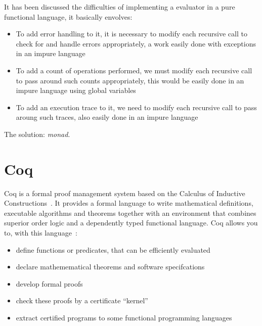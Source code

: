 It has been discussed the difficulties of implementing a evaluator in a pure
functional language, it basically envolves:
\begin{itemize}
\item To add error handling to it, it is necessary to modify each recursive call to
check for and handle errors appropriately, a work easily done with exceptions in
an impure language
\item To add a count of operations performed, we must modify each
recursive call to pass around such counts appropriately, this would be easily
done in an impure language using global variables
\item To add an execution trace to it, we need to modify each recursive call to
pass aroung such traces, also easily done in an impure language
\end{itemize}

The solution: \textit{monad}.

\section{Coq} 
Coq is a formal proof management system based on the Calculus of Inductive
Constructions~\cite{coqart}. It provides a formal language to write mathematical
definitions, executable algorithms and theorems together with an environment
that combines superior order logic and a dependently typed functional language.
Coq allows you to, with this language~\cite{coqsite}:
\begin{itemize}
\item define functions or predicates, that can be efficiently evaluated
\item declare mathemematical theorems and software specifcations
\item develop formal proofs
\item check these proofs by a certificate ``kernel''
\item extract certified programs to some functional programming languages
\end{itemize}


